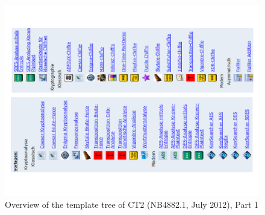 \clearpage
\begin{figure}[hb]
\begin{center}
\vspace{-30pt}
\includegraphics[scale=0.8, angle=270]
                {figures/CT2-templatetree-en}
\caption{Overview of the template tree of CT2 (NB4882.1, July 2012), Part 1} 
\label{menuoverview}
\end{center}
\end{figure}
\clearpage

